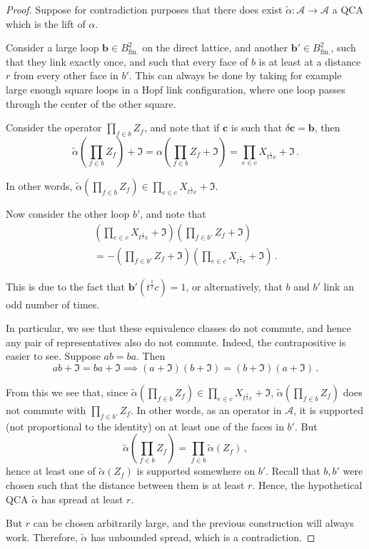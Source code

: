 \documentclass[aps,twocolumn,prx,floatfix,preprintnumbers, nofootinbib,10pt]{revtex4-2}
\numberwithin{equation}{section}
\theoremstyle{definition}
\theoremstyle{remark}
\theoremstyle{claim}
\newcommand{\be}{\begin{equation}}
\newcommand{\ee}{\end{equation}}
\newcommand{\mc}[1]{\mathcal{#1}}
\newcommand{\paren}[1]{\left( #1 \right)}
\begin{document}
\begin{proof}
 Suppose for contradiction purposes that there does exist $\tilde{\alpha} : \mc{A} \rightarrow \mc{A}$ a QCA which is the lift of $\alpha$.

 Consider a large loop $\bm{b} \in B^2_\text{fin.}$ on the direct lattice, and another $\bm{b}' \in B^2_\text{fin.}$, such that they link exactly once, and such that every face of $b$ is at least at a distance $r$ from every other face in $b'$. This can always be done by taking for example large enough square loops in a Hopf link configuration, where one loop passes through the center of the other square.

 Consider the operator $\prod_{f \in b} Z_f$, and note that if $\bm{c}$ is such that $\delta \bm{c} = \bm{b}$, then
 \be
 \tilde{\alpha}\paren{\prod_{f \in b} Z_f} + \mathfrak{I} = \alpha \paren{\prod_{f \in b} Z_f + \mathfrak{I}} = \prod_{e \in c} X_{t^\frac{1}{2} e} + \mathfrak{I} \,.
 \ee

 In other words, $\tilde{\alpha}(\prod_{f \in b} Z_f) \in \prod_{e \in c} X_{t^\frac{1}{2} e} + \mathfrak{I}$.

 Now consider the other loop $b'$, and note that
 \begin{multline}
 \paren{\prod_{e \in c} X_{t^\frac{1}{2} e} + \mathfrak{I}} \paren{\prod_{f \in b'} Z_f + \mathfrak{I}} \\
 = - \paren{\prod_{f \in b'} Z_f + \mathfrak{I}} \paren{\prod_{e \in c} X_{t^\frac{1}{2} e} + \mathfrak{I}} \,.
 \end{multline}

 This is due to the fact that $\bm{b}'(t^\frac{1}{2} c) = 1$, or alternatively, that $b$ and $b'$ link an odd number of times.

 In particular, we see that these equivalence classes do not commute, and hence any pair of representatives also do not commute. Indeed, the contrapositive is easier to see. Suppose $ab = ba$. Then
 \be
 ab + \mathfrak{I} = ba + \mathfrak{I} \implies (a + \mathfrak{I}) (b + \mathfrak{I}) = (b + \mathfrak{I}) (a + \mathfrak{I}) \,.
 \ee

 From this we see that, since $\tilde{\alpha}(\prod_{f \in b} Z_f) \in \prod_{e \in c} X_{t^\frac{1}{2} e} + \mathfrak{I}$, $\tilde{\alpha}(\prod_{f \in b} Z_f)$ does not commute with $\prod_{f \in b'} Z_f$. In other words, as an operator in $\mc{A}$, it is supported (not proportional to the identity) on at least one of the faces in $b'$. But
 \be
 \tilde{\alpha}\paren{\prod_{f \in b} Z_f} = \prod_{f \in b} \tilde{\alpha}(Z_f) \,,
 \ee
 hence at least one of $\tilde{\alpha}(Z_f)$ is supported somewhere on $b'$. Recall that $b, b'$ were chosen such that the distance between them is at least $r$. Hence, the hypothetical QCA $\tilde{\alpha}$ has spread at least $r$.

 But $r$ can be chosen arbitrarily large, and the previous construction will always work. Therefore, $\tilde{\alpha}$ has unbounded spread, which is a contradiction.
\end{proof}
\end{document}

